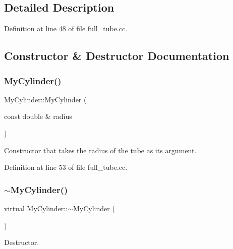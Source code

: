 \subsection{Detailed Description}


Definition at line 48 of file full\+\_\+tube.\+cc.



\subsection{Constructor \& Destructor Documentation}
\mbox{\label{classMyCylinder_ab4794e9b1b43d02e62cfe660b902e469}} 
\subsubsection{\texorpdfstring{My\+Cylinder()}{MyCylinder()}}
{\footnotesize\ttfamily My\+Cylinder\+::\+My\+Cylinder (\begin{DoxyParamCaption}\item[{const double \&}]{radius }\end{DoxyParamCaption})\hspace{0.3cm}{\ttfamily [inline]}}



Constructor that takes the radius of the tube as its argument. 



Definition at line 53 of file full\+\_\+tube.\+cc.

\mbox{\label{classMyCylinder_ab886e268e53bd295cc2d220a96e93bd9}} 
\subsubsection{\texorpdfstring{$\sim$\+My\+Cylinder()}{~MyCylinder()}}
{\footnotesize\ttfamily virtual My\+Cylinder\+::$\sim$\+My\+Cylinder (\begin{DoxyParamCaption}{ }\end{DoxyParamCaption})\hspace{0.3cm}{\ttfamily [inline]}}



Destructor. 



